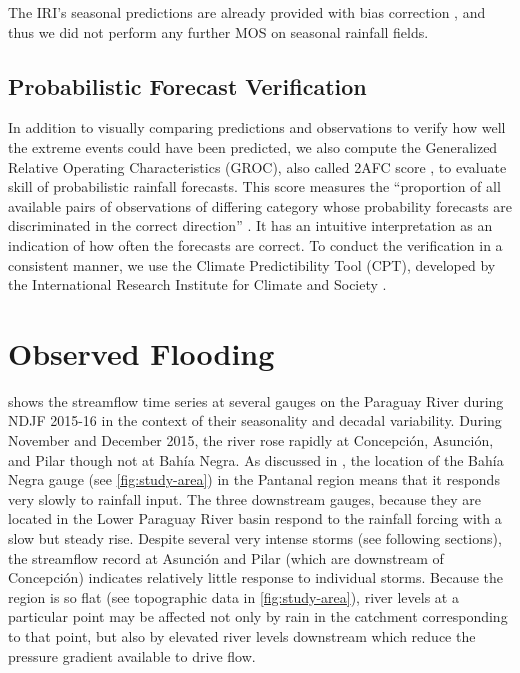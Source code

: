 \documentclass[twocol]{ametsoc}
\begin{document}
The IRI's seasonal predictions are already provided with bias correction \citep{Barnston:2010ge}, and thus we did not perform any further MOS on seasonal rainfall fields.

\subsection{Probabilistic Forecast Verification}

In addition to visually comparing predictions and observations to verify how well the extreme events could have been predicted, we also compute the Generalized Relative Operating Characteristics (GROC), also called 2AFC score \citep{Mason:2009kr}, to evaluate skill of probabilistic rainfall forecasts.
This score measures the ``proportion of all available pairs of observations of differing category whose probability forecasts are discriminated in the correct direction'' \citep{Mason:2009kr}.
It has an intuitive interpretation as an indication of how often the forecasts are correct.
To conduct the verification in a consistent manner, we use the Climate Predictibility Tool (CPT), developed by the International Research Institute for Climate and Society \citep{Mason:2017gg}.


\section{Observed Flooding} \label{sec:flood}

 shows the streamflow time series at several gauges on the Paraguay River during NDJF 2015-16 in the context of their seasonality and decadal variability.
During November and December 2015, the river rose rapidly at Concepci\'on, Asunci\'on, and Pilar though not at Bah\'ia Negra.
As discussed in \citet{Bravo:2011et,Barros:2004bn}, the location of the Bah\'ia Negra gauge (see \cref{fig:study-area}) in the Pantanal region means that it responds very slowly to rainfall input.
The three downstream gauges, because they are located in the Lower Paraguay River basin respond to the rainfall forcing with a slow but steady rise.
Despite several very intense storms (see following sections), the streamflow record at Asunci\'on and Pilar (which are downstream of Concepci\'on) indicates relatively little response to individual storms.
Because the region is so flat (see topographic data in \cref{fig:study-area}), river levels at a particular point may be affected not only by rain in the catchment corresponding to that point, but also by elevated river levels downstream which reduce the pressure gradient available to drive flow.
\end{document}
